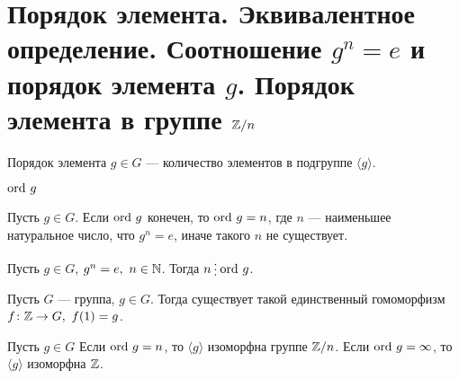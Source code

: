 % 
% 
\section{Порядок элемента. Эквивалентное определение. Соотношение $ g^{n} = e$ и порядок элемента $ g$. Порядок элемента в группе  $ \mathbb{Z} / n$}
\begin{defn}
    {\sf Порядок элемента } $ g \in G$ --- количество элементов в подгруппе $ \langle g \rangle$.  
    \begin{name}
        ${\mathop{\text{\rm ord}}}~ g$
    \end{name}
\end{defn}
\begin{lm}
    Пусть $ g \in G$. Если $ {\mathop{\text{\rm ord}}}~ g$ конечен, то  $ {\mathop{\text{\rm ord}}}~ g =n$, где  $ n $ --- наименьшее натуральное число, что  $ g^{n} = e$, иначе такого $ n$ не существует.
\end{lm}
\begin{st}
    Пусть $ g \in G$, $ g^{n} = e, ~n \in \mathbb{N}$. Тогда $ n \del \ord g$. 
\end{st}

\begin{lm}
    Пусть $ G$ --- группа, $ g \in G$. Тогда существует такой единственный гомоморфизм  $ f\colon \mathbb{Z} \to  G, ~ f(1) = g$.
\end{lm}

\begin{thm}
    Пусть $ g \in G$ Если ${\mathop{\text{\rm ord}}}~ g = n$, то $ \langle g \rangle$ изоморфна группе  $ \mathbb{Z} / n$. Если  $ {\mathop{\text{\rm ord}}}~ g = \infty$, то $ \langle g \rangle $ изоморфна $ \mathbb{Z}$.
\end{thm}
% 
